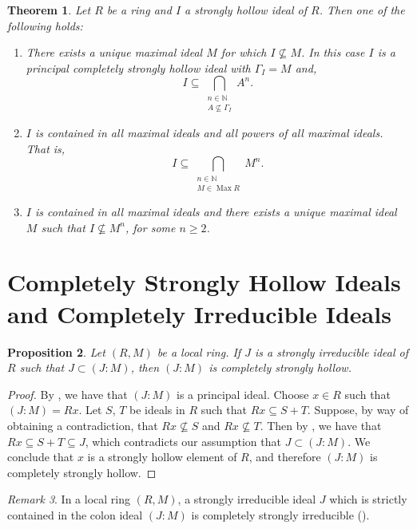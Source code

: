 \documentclass[11pt,english]{amsart}
\newcommand{\Max}{\operatorname{Max}}
\newtheorem{theorem}{Theorem}[section]
\newtheorem{proposition}[theorem]{Proposition}
\theoremstyle{definition}
\numberwithin{equation}{section}
\theoremstyle{remark}
\newtheorem{remark}[theorem]{Remark}
\begin{document}
\begin{theorem}
    Let $R$ be a ring and $I$ a strongly hollow ideal of $R$. Then one of the following holds:
    \begin{enumerate}
        \item There exists a unique maximal ideal $M$ for which $I\not\subseteq M$. In this case $I$ is a principal completely strongly hollow ideal with $\Gamma_I=M$ and, $$I\subseteq \bigcap_{\substack{n\in\mathds{N}\\ A\not\subseteq \Gamma_I}} A^n.$$ 
        \item $I$ is contained in all maximal ideals and all powers of all maximal ideals. That is, 
    $$I \subseteq \bigcap_{\substack{n\in\mathds{N}\\ M\in \Max{{R}}}}M^n.$$
    \item $I$ is contained in all maximal ideals and there exists a unique maximal ideal $M$ such that $I\not\subseteq M^n$, for some  $n\geq 2$.
    \end{enumerate}
\end{theorem}

\smallskip
\section{Completely Strongly Hollow Ideals and Completely Irreducible Ideals}
\label{3}
\begin{proposition}\label{ci_gives_ch}
    Let $(R,M)$ be a local ring. If $J$ is a strongly irreducible ideal of $R$ such that $J\subset (J:M)$, then $(J:M)$ is completely strongly hollow.
\end{proposition}
\begin{proof}
    By \cite[Theorem.~2.6(1)]{HRR2002}, we have that $(J:M)$ is a principal ideal. Choose $x\in R$ such that $(J:M)=Rx$. Let $S$, $T$ be ideals in $R$ such that $Rx\subseteq S+T$. Suppose, by way of obtaining a contradiction, that $Rx\not\subseteq S$ and $Rx\not\subseteq T$. Then by \cite[Theorem.~2.6(3)]{HRR2002}, we have that $Rx\subseteq S+T\subseteq J$, which contradicts our assumption that $J\subset (J:M)$. We conclude that $x$ is a strongly hollow element of $R$, and therefore $(J:M)$ is completely strongly hollow.
\end{proof}

\begin{remark}
In a local ring $(R,M)$, a strongly irreducible ideal $J$ which is strictly contained in the colon ideal $(J:M)$ is completely strongly irreducible (\cite[Theorem.~1.3(iv)]{FHO}).
\end{remark}
\end{document}
